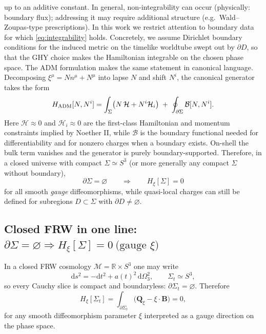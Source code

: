 \documentclass[
  reprint,
  amsmath,amssymb,
  aps,
  prd,
  superscriptaddress,
  nofootinbib,
  longbibliography
]{revtex4-2}
\newcommand{\dd}{\mathrm{d}}
\newcommand{\M}{\mathcal{M}}
\newcommand{\Q}{\bm{Q}}
\newcommand{\Bnd}{\bm{B}}
\begin{document}
up to an additive constant.
In general, non-integrability can occur (physically: boundary flux); addressing it may require additional structure (e.g.\ Wald--Zoupas-type prescriptions\cite{WaldZoupas2000}). In this work we restrict attention to boundary data for which \eqref{eq:integrability} holds. Concretely, we assume Dirichlet boundary conditions for the induced metric on the timelike worldtube swept out by $\partial D$, so that the GHY choice makes the Hamiltonian integrable on the chosen phase space.
The ADM formulation makes the same statement in canonical language.
Decomposing $\xi^\mu=N n^\mu+N^\mu$ into lapse $N$ and shift $N^i$, the canonical generator takes the form
\begin{equation}
  H_{\rm ADM}[N,N^i]
  =\int_{\Sigma}\bigl(N\,\mathcal{H}+N^i\mathcal{H}_i\bigr)\;+\;\oint_{\partial\Sigma}\mathcal{B}[N,N^i].
\end{equation}
Here $\mathcal{H}\approx0$ and $\mathcal{H}_i\approx0$ are the first-class Hamiltonian and momentum constraints implied by Noether II,
while $\mathcal{B}$ is the boundary functional needed for differentiability and for nonzero charges when a boundary exists.
On-shell the bulk term vanishes and the generator is purely boundary-supported. Therefore, in a closed universe with compact $\Sigma\simeq S^{3}$ (or more generally any compact $\Sigma$ without boundary),
\begin{equation}
  \partial\Sigma=\varnothing
  \qquad\Longrightarrow\qquad
  H_\xi[\Sigma]=0
\end{equation}
for all smooth \emph{gauge} diffeomorphisms, while quasi-local charges can still be defined for subregions $D\subset\Sigma$ with $\partial D\neq\varnothing$.
\subsection{Closed FRW in one line: \texorpdfstring{$\partial\Sigma=\varnothing\Rightarrow H_\xi[\Sigma]=0\ \text{(gauge }\xi\text{)}$}{dSigma=empty => H_xi[Sigma]=0}}
In a closed FRW cosmology $\M=\mathbb{R}\times S^{3}$ one may write
\begin{equation}
\dd s^2=-\dd t^2+a(t)^2\,\dd\Omega_3^2,
\qquad
\Sigma_t\simeq S^3,
\end{equation}
so every Cauchy slice is compact and boundaryless: $\partial\Sigma_t=\varnothing$. Therefore
\begin{equation}
H_\xi[\Sigma_t] = \int_{\partial\Sigma_t}\bigl(\Q_\xi-\xi\cdot\Bnd\bigr)=0,
\end{equation}
for any smooth diffeomorphism parameter $\xi$ interpreted as a gauge direction on the phase space.
\end{document}
